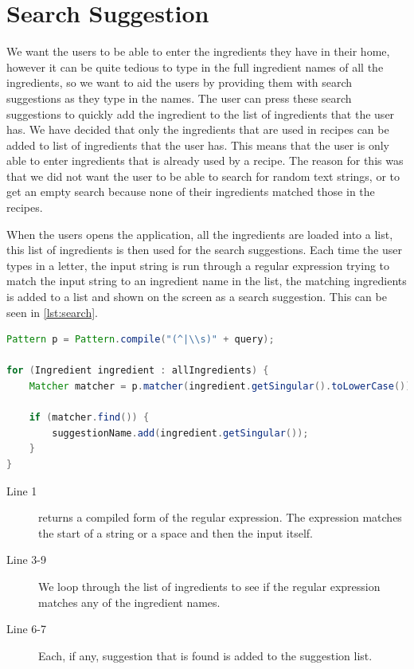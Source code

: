 \section{Search Suggestion}
We want the users to be able to enter the ingredients they have in their home, however it can be quite tedious to type in the full ingredient names of all the ingredients, so we want to aid the users by providing them with search suggestions as they type in the names. The user can press these search suggestions to quickly add the ingredient to the list of ingredients that the user has. 
We have decided that only the ingredients that are used in recipes can be added to list of ingredients that the user has. This means that the user is only able to enter ingredients that is already used by a recipe. The reason for this was that we did not want the user to be able to search for random text strings, or to get an empty search because none of their ingredients matched those in the recipes. 

When the users opens the application, all the ingredients are loaded into a list, this list of ingredients is then used for the search suggestions. Each time the user types in a letter, the input string is run through a regular expression trying to match the input string to an ingredient name in the list, the matching ingredients is added to a list and shown on the screen as a search suggestion. This can be seen in \autoref{lst:search}.
\pagebreak

\begin{lstlisting}[language=java, label=lst:search, caption={Search suggestions.}]
Pattern p = Pattern.compile("(^|\\s)" + query);

for (Ingredient ingredient : allIngredients) {
    Matcher matcher = p.matcher(ingredient.getSingular().toLowerCase());

    if (matcher.find()) {
        suggestionName.add(ingredient.getSingular());
    }
}
\end{lstlisting}

\begin{description}
\item[Line 1]  returns a compiled form of the regular expression. The expression matches the start of a string or a space and then the input itself. 
\item[Line 3-9] We loop through the list of ingredients to see if the regular expression matches any of the ingredient names.
\item[Line 6-7] Each, if any, suggestion that is found is added to the suggestion list.
\end{description}

